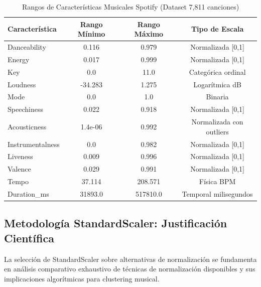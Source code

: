 \documentclass[12pt,a4paper]{report}
\begin{document}
\begin{table}[H]
\centering
\caption{Rangos de Características Musicales Spotify (Dataset 7,811 canciones)}
\begin{tabular}{|l|c|c|c|}
\hline
\textbf{Característica} & \textbf{Rango Mínimo} & \textbf{Rango Máximo} & \textbf{Tipo de Escala} \\
\hline
Danceability & 0.116 & 0.979 & Normalizada [0,1] \\
\hline
Energy & 0.017 & 0.999 & Normalizada [0,1] \\
\hline
Key & 0.0 & 11.0 & Categórica ordinal \\
\hline
Loudness & -34.283 & 1.275 & Logarítmica dB \\
\hline
Mode & 0.0 & 1.0 & Binaria \\
\hline
Speechiness & 0.022 & 0.918 & Normalizada [0,1] \\
\hline
Acousticness & 1.4e-06 & 0.992 & Normalizada con outliers \\
\hline
Instrumentalness & 0.0 & 0.982 & Normalizada [0,1] \\
\hline
Liveness & 0.009 & 0.996 & Normalizada [0,1] \\
\hline
Valence & 0.029 & 0.991 & Normalizada [0,1] \\
\hline
Tempo & 37.114 & 208.571 & Física BPM \\
\hline
Duration\_ms & 31893.0 & 517810.0 & Temporal milisegundos \\
\hline
\end{tabular}
\end{table}

\subsection{Metodología StandardScaler: Justificación Científica}

La selección de StandardScaler sobre alternativas de normalización se fundamenta en análisis comparativo exhaustivo de técnicas de normalización disponibles y sus implicaciones algorítmicas para clustering musical.
\end{document}
